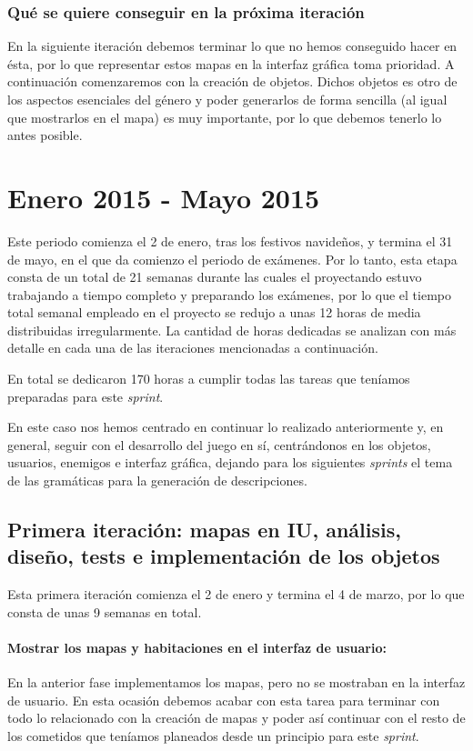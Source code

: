 \subsubsection{Qué se quiere conseguir en la próxima iteración}

En la siguiente iteración debemos terminar lo que no hemos conseguido hacer en ésta, por lo que representar estos mapas en la interfaz gráfica toma prioridad. A continuación comenzaremos con la creación de objetos. Dichos objetos es otro de los aspectos esenciales del género y poder generarlos de forma sencilla (al igual que mostrarlos en el mapa) es muy importante, por lo que debemos tenerlo lo antes posible.

\section{Enero 2015 - Mayo 2015}

Este periodo comienza el 2 de enero, tras los festivos navideños, y termina el 31 de mayo, en el que da comienzo el periodo de exámenes. Por lo tanto, esta etapa consta de un total de 21 semanas durante las cuales el proyectando estuvo trabajando a tiempo completo y preparando los exámenes, por lo que el tiempo total semanal empleado en el proyecto se redujo a unas 12 horas de media distribuidas irregularmente. La cantidad de horas dedicadas se analizan con más detalle en cada una de las iteraciones mencionadas a continuación.

En total se dedicaron 170 horas a cumplir todas las tareas que teníamos preparadas para este \textit{sprint}.

En este caso nos hemos centrado en continuar lo realizado anteriormente y, en general, seguir con el desarrollo del juego en sí, centrándonos en los objetos, usuarios, enemigos e interfaz gráfica, dejando para los siguientes \textit{sprints} el tema de las gramáticas para la generación de descripciones.

\subsection{Primera iteración: mapas en IU, análisis, diseño, tests e implementación de los objetos}

Esta primera iteración comienza el 2 de enero y termina el 4 de marzo, por lo que consta de unas 9 semanas en total.

\paragraph{Mostrar los mapas y habitaciones en el interfaz de usuario:} En la anterior fase implementamos los mapas, pero no se mostraban en la interfaz de usuario. En esta ocasión debemos acabar con esta tarea para terminar con todo lo relacionado con la creación de mapas y poder así continuar con el resto de los cometidos que teníamos planeados desde un principio para este \textit{sprint}.

